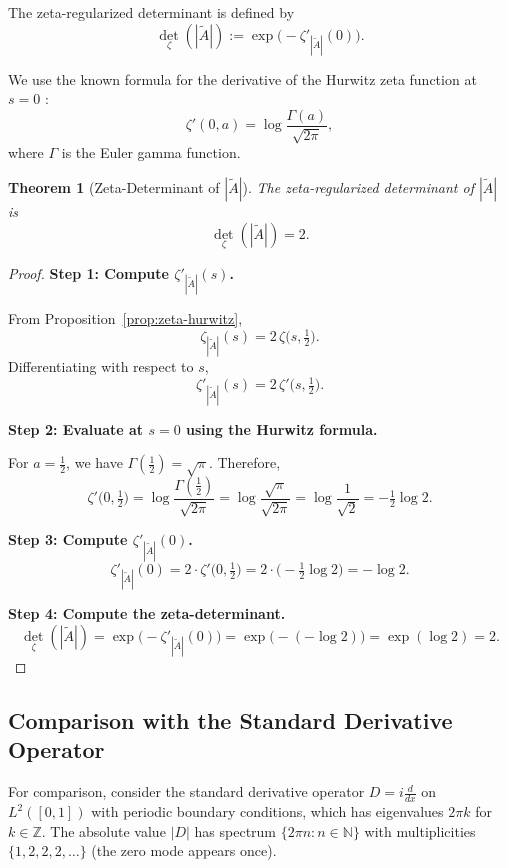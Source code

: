 \documentclass[11pt]{amsart}
\newtheorem{theorem}{Theorem}[section]
\theoremstyle{definition}
\theoremstyle{remark}
\begin{document}
The zeta-regularized determinant is defined by
\[
\det_{\zeta}(|\widetilde{A}|) := \exp\bigl(-\zeta'_{|\widetilde{A}|}(0)\bigr).
\]

We use the known formula for the derivative of the Hurwitz zeta function at $s=0$ \cite{whittaker-watson}:
\[
\zeta'(0, a) = \log \frac{\Gamma(a)}{\sqrt{2\pi}},
\]
where $\Gamma$ is the Euler gamma function.

\begin{theorem}[Zeta-Determinant of $|\widetilde{A}|$]
\label{thm:zeta-det}
The zeta-regularized determinant of $|\widetilde{A}|$ is
\[
\det_{\zeta}(|\widetilde{A}|) = 2.
\]
\end{theorem}

\begin{proof}
\textbf{Step 1: Compute $\zeta'_{|\widetilde{A}|}(s)$.}

From Proposition~\ref{prop:zeta-hurwitz},
\[
\zeta_{|\widetilde{A}|}(s) = 2 \, \zeta\bigl(s, \tfrac{1}{2}\bigr).
\]
Differentiating with respect to $s$,
\[
\zeta'_{|\widetilde{A}|}(s) = 2 \, \zeta'\bigl(s, \tfrac{1}{2}\bigr).
\]

\textbf{Step 2: Evaluate at $s=0$ using the Hurwitz formula.}

For $a = \tfrac{1}{2}$, we have $\Gamma(\tfrac{1}{2}) = \sqrt{\pi}$. Therefore,
\[
\zeta'\bigl(0, \tfrac{1}{2}\bigr) = \log \frac{\Gamma(\tfrac{1}{2})}{\sqrt{2\pi}} = \log \frac{\sqrt{\pi}}{\sqrt{2\pi}} = \log \frac{1}{\sqrt{2}} = -\tfrac{1}{2} \log 2.
\]

\textbf{Step 3: Compute $\zeta'_{|\widetilde{A}|}(0)$.}
\[
\zeta'_{|\widetilde{A}|}(0) = 2 \cdot \zeta'\bigl(0, \tfrac{1}{2}\bigr) = 2 \cdot \bigl(-\tfrac{1}{2} \log 2\bigr) = -\log 2.
\]

\textbf{Step 4: Compute the zeta-determinant.}
\[
\det_{\zeta}(|\widetilde{A}|) = \exp\bigl(-\zeta'_{|\widetilde{A}|}(0)\bigr) = \exp\bigl(-(-\log 2)\bigr) = \exp(\log 2) = 2.
\]
\end{proof}

\subsection{Comparison with the Standard Derivative Operator}

For comparison, consider the standard derivative operator $D = i\frac{d}{dx}$ on $L^2([0,1])$ with periodic boundary conditions, which has eigenvalues $2\pi k$ for $k \in \mathbb{Z}$. The absolute value $|D|$ has spectrum $\{2\pi n : n \in \mathbb{N}\}$ with multiplicities $\{1, 2, 2, 2, \ldots\}$ (the zero mode appears once).
\end{document}
